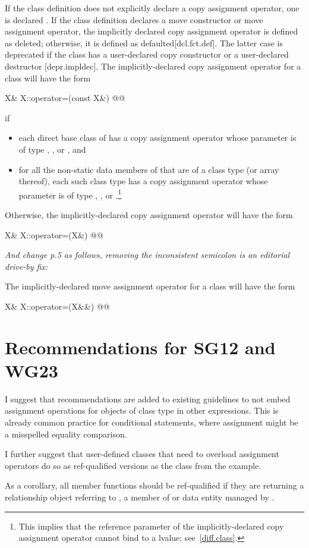 \documentclass[ebook,11pt,article]{memoir}
\renewcommand{\iref}[1]{[#1]}
\begin{document}
\pnum
If the class definition does not explicitly declare a copy assignment operator,
one is declared .
If the class definition declares a move
constructor or move assignment operator, the implicitly declared copy
assignment operator is defined as deleted; otherwise, it is defined as
defaulted\iref{dcl.fct.def}.
The latter case is deprecated if the class has a user-declared copy constructor
or a user-declared destructor \iref{depr.impldec}.
The implicitly-declared copy assignment operator for a class
will have the form
\begin{codeblock}
X& X::operator=(const X&) @\added{\tcode{\&}}@
\end{codeblock}
if
\begin{itemize}
\item
each direct base class  of 
has a copy assignment operator whose parameter is of type
, , or , and
\item
for all the non-static data members of 
that are of a class type  (or array thereof),
each such class type has a copy assignment operator whose parameter is of type
, ,
or .\footnote{This implies that the reference parameter of the
implicitly-declared copy assignment operator cannot bind to a
 lvalue; see~\ref{diff.class}.}
\end{itemize}

Otherwise, the implicitly-declared copy assignment operator
will have the form
\begin{codeblock}
X& X::operator=(X&) @\added{\tcode{\&}}@
\end{codeblock}


\pnum
\pnum
\emph{And change p.5 as follows, removing the inconsistent semicolon is an editorial drive-by fix:}

\pnum
The implicitly-declared move assignment operator for a class  will have the form
\begin{codeblock}
X& X::operator=(X&&) @\added{\tcode{\&}}\removed{\tcode{;}}@
\end{codeblock}

\chapter{Recommendations for SG12 and WG23}

I suggest that recommendations are added to existing guidelines to not embed assignment operations for objects of class type in other expressions. 
This is already common practice for conditional statements, where assignment might be a misspelled equality comparison.

I further suggest that user-defined classes that need to overload assignment operators do so as ref-qualified versions as the  class from the example.

As a corollary, all member functions should be ref-qualified if they are returning a relationship object referring to , a member of or data entity managed by .

 
\end{document}
